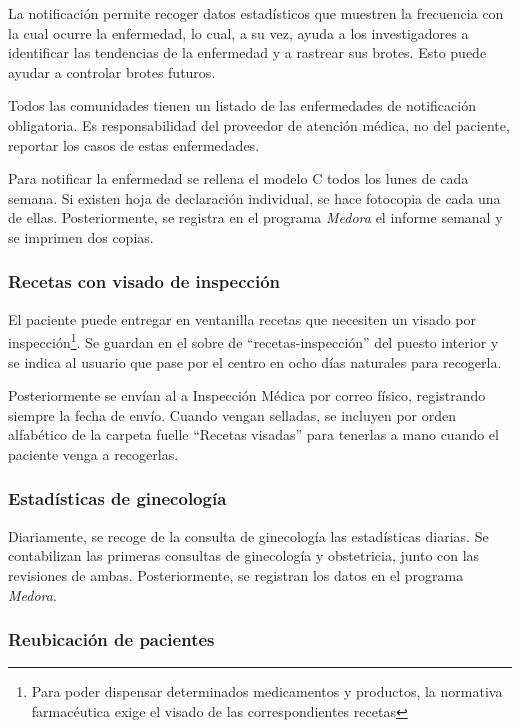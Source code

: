 La notificación permite recoger datos estadísticos que muestren la frecuencia con la cual ocurre la enfermedad, lo cual, a su vez, ayuda a los investigadores a identificar las tendencias de la enfermedad y a rastrear sus brotes. Esto puede ayudar a controlar brotes futuros.

Todos las comunidades tienen un listado de las enfermedades de notificación obligatoria. Es responsabilidad del proveedor de atención médica, no del paciente, reportar los casos de estas enfermedades.

Para notificar la enfermedad se rellena el modelo C todos los lunes de cada semana.
Si existen hoja de declaración individual, se hace fotocopia de cada una de ellas.
Posteriormente, se registra en el programa \textit{Medora} el informe semanal y se imprimen dos copias.


\subsubsection{Recetas con visado de inspección}

El paciente puede entregar en ventanilla recetas que necesiten un visado por inspección\footnote{Para poder dispensar determinados medicamentos y productos, la normativa farmacéutica exige el visado de las correspondientes recetas}.
Se guardan en el sobre de ``recetas-inspección'' del puesto interior y se indica al usuario que pase por el centro en ocho días naturales para recogerla.

Posteriormente se envían al a Inspección Médica por correo físico, registrando siempre la fecha de envío.
Cuando vengan selladas, se incluyen por orden alfabético de la carpeta fuelle ``Recetas visadas'' para tenerlas a mano cuando el paciente venga a recogerlas.

\subsubsection{Estadísticas de ginecología}

Diariamente, se recoge de la consulta de ginecología las estadísticas diarias.
Se contabilizan las primeras consultas de ginecología y obstetricia, junto con las revisiones de ambas.
Posteriormente, se registran los datos en el programa \textit{Medora}.

\subsubsection{Reubicación de pacientes}

